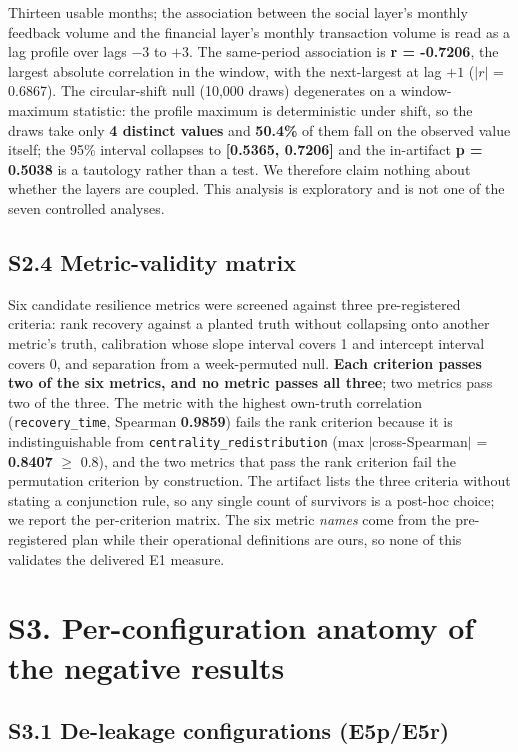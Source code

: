 \documentclass[11pt,a4paper]{article}
\begin{document}
Thirteen usable months; the association between the social layer's monthly
feedback volume and the financial layer's monthly transaction volume is read as
a lag profile over lags $-3$ to $+3$. The same-period association is
\textbf{r = -0.7206}, the largest absolute correlation in the window, with the
next-largest at lag $+1$ ($|r|$ = 0.6867). The circular-shift null (10,000 draws)
degenerates on a window-maximum statistic: the profile maximum is deterministic
under shift, so the draws take only \textbf{4 distinct values} and \textbf{50.4\%}
of them fall on the observed value itself; the 95\% interval collapses to
\textbf{[0.5365, 0.7206]} and the in-artifact \textbf{p = 0.5038} is a tautology
rather than a test. We therefore claim nothing about whether the layers are
coupled. This analysis is exploratory and is not one of the seven controlled
analyses.

\subsection*{S2.4 Metric-validity matrix}

Six candidate resilience metrics were screened against three pre-registered
criteria: rank recovery against a planted truth without collapsing onto another
metric's truth, calibration whose slope interval covers 1 and intercept interval
covers 0, and separation from a week-permuted null. \textbf{Each criterion passes
two of the six metrics, and no metric passes all three}; two metrics pass two of
the three. The metric with the highest own-truth correlation
(\texttt{recovery\_time}, Spearman \textbf{0.9859}) fails the rank criterion
because it is indistinguishable from \texttt{centrality\_redistribution} (max
$|$cross-Spearman$|$ = \textbf{0.8407} $\geq$ 0.8), and the two metrics that pass
the rank criterion fail the permutation criterion by construction. The artifact
lists the three criteria without stating a conjunction rule, so any single count
of survivors is a post-hoc choice; we report the per-criterion matrix. The six
metric \emph{names} come from the pre-registered plan while their operational
definitions are ours, so none of this validates the delivered E1 measure.

\section*{S3. Per-configuration anatomy of the negative results}

\subsection*{S3.1 De-leakage configurations (E5p/E5r)}
\end{document}
